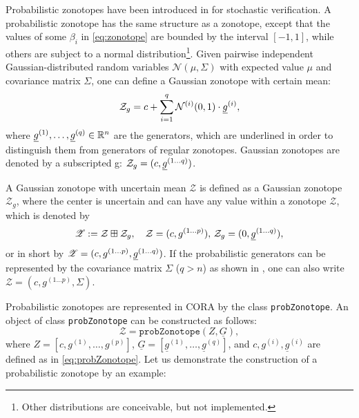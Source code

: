  \label{sec:probabilisticZonotopes}

Probabilistic zonotopes have been introduced in \cite{Althoff2009d} for stochastic verification. A probabilistic zonotope has the same structure as a zonotope, except that the values of some $\beta_i$ in \eqref{eq:zonotope} are bounded by the interval $[-1,1]$, while others are subject to a normal distribution\footnote{Other distributions are conceivable, but not implemented.}. Given pairwise independent Gaussian-distributed random variables $\mathcal{N}(\mu, \Sigma)$ with expected value $\mu$ and covariance matrix $\Sigma$, one can define a Gaussian zonotope with certain mean:
\begin{equation*}
 \mathcal{Z}_g=c+\sum_{i=1}^{q} \mathcal{N}^{(i)}(0,1)\cdot \underline{g}^{(i)},
\end{equation*}
where $\underline{g}^{(1)},\ldots,\underline{g}^{(q)}\in\mathbb{R}^n$ are the generators, which are underlined in order to distinguish them from generators of regular zonotopes. Gaussian zonotopes are denoted by a subscripted g: $\mathcal{Z}_g=(c,\underline{g}^{(1\ldots q)})$.

A Gaussian zonotope with uncertain mean $\mathscr{Z}$ is defined as a Gaussian zonotope $\mathcal{Z}_g$, where the center is uncertain and can have any value within a zonotope $\mathcal{Z}$, which is denoted by
\begin{equation}
 \mathscr{Z} := \mathcal{Z}\boxplus\mathcal{Z}_g, \quad \mathcal{Z}=(c,g^{(1\ldots p)}), \, \mathcal{Z}_g=(0,\underline{g}^{(1\ldots q)}),
 \label{eq:probZonotope}
\end{equation}
or in short by $\mathscr{Z}=(c,g^{(1\ldots p)},\underline{g}^{(1\ldots q)})$. If the probabilistic generators can be represented by the covariance matrix $\Sigma$ ($q>n$) as shown in \cite[Proposition 1]{Althoff2009d}, one can also write $\mathscr{Z}=(c,g^{(1\ldots p)},\Sigma)$. 

Probabilistic zonotopes are represented in CORA by the class \texttt{probZonotope}. An object of class \texttt{probZonotope} can be constructed as follows:
\begin{equation*}
		\mathscr{Z} = \texttt{probZonotope}(Z,\underline{G}),
\end{equation*} 
where $Z = [c,g^{(1)},\dots,g^{(p)}]$, $\underline{G} = [\underline{g}^{(1)},\dots,\underline{g}^{(q)}]$, and $c,g^{(i)},\underline{g}^{(i)}$ are defined as in \eqref{eq:probZonotope}. Let us demonstrate the construction of a probabilistic zonotope by an example:


